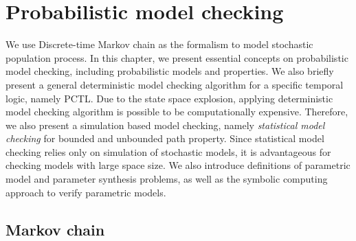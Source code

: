 \chapter{Probabilistic model checking}
We use Discrete-time Markov chain as the formalism to model stochastic population process. In this
chapter, we present essential concepts on probabilistic model checking, including probabilistic
models and properties. We also briefly present a general deterministic model checking algorithm for
a specific temporal logic, namely PCTL. Due to the state space explosion, applying deterministic
model checking algorithm is possible to be computationally expensive. Therefore, we also present a
simulation based model checking, namely \textit{statistical model checking} for bounded and
unbounded path property. Since statistical model checking relies only on simulation of stochastic
models, it is advantageous for checking models with large space size. We also introduce definitions
of parametric model and parameter synthesis problems, as well as the symbolic computing approach to
verify parametric models.


\section{Markov chain}
